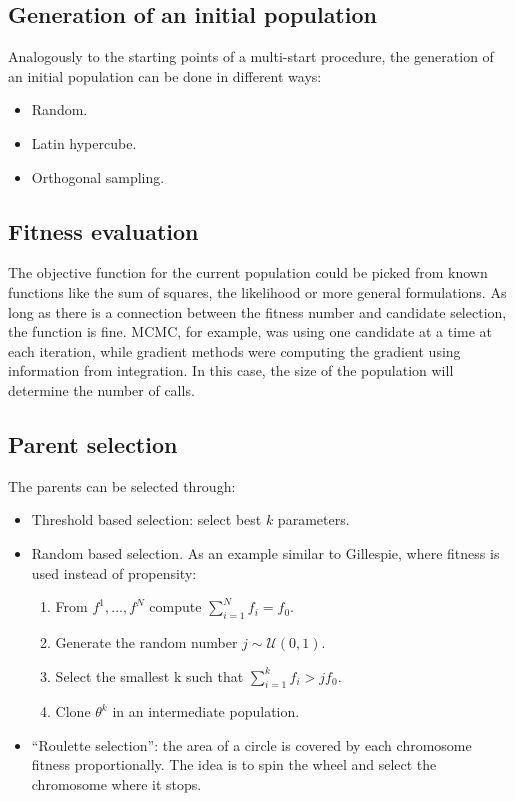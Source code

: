   \subsection{Generation of an initial population}
  Analogously to the starting points of a multi-start procedure, the generation of an initial population can be done in different ways:

  \begin{multicols}{2}
    \begin{itemize}
      \item Random.
      \item Latin hypercube.
      \item Orthogonal sampling.
    \end{itemize}
  \end{multicols}

  \subsection{Fitness evaluation}
  The objective function for the current population could be picked from known functions like the sum of squares, the likelihood or more general formulations.
  As long as there is a connection between the fitness number and candidate selection, the function is fine.
  MCMC, for example, was using one candidate at a time at each iteration, while gradient methods were computing the gradient using information from integration.
  In this case, the size of the population will determine the number of calls.

  \subsection{Parent selection}
  The parents can be selected through:

  \begin{multicols}{2}
    \begin{itemize}
      \item Threshold based selection: select best $k$ parameters.
      \item Random based selection.
        As an example similar to Gillespie, where fitness is used instead of propensity:

        \begin{enumerate}
          \item From \(f^1,\dots,f^N\) compute \(\sum^N_{i=1}f_i=f_0\).
          \item Generate the random number \(j \sim \mathcal{U}(0,1)\).
          \item Select the smallest k such that \(\sum^k_{i=1}f_i>jf_0\).
          \item Clone \(\theta^k\) in an intermediate population.
        \end{enumerate}

      \item ``Roulette selection'': the area of a circle is covered by each chromosome fitness proportionally.
        The idea is to spin the wheel and select the chromosome where it stops.
    \end{itemize}
  \end{multicols}

